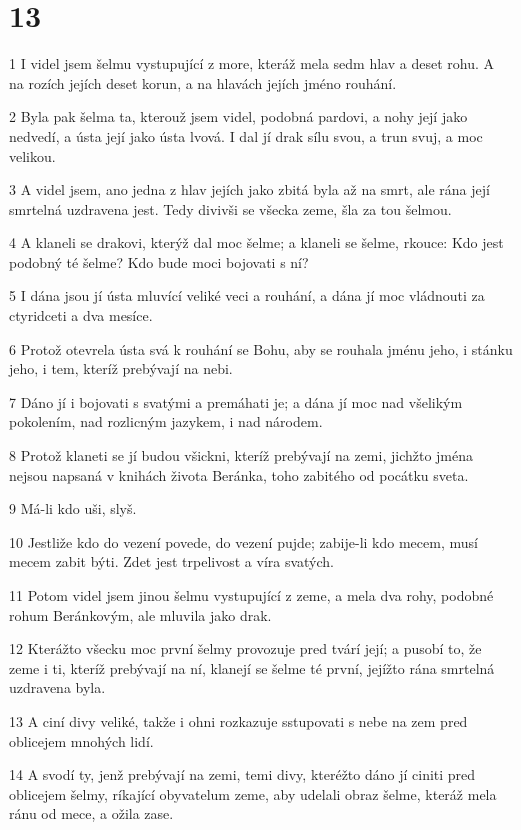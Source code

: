 \chapter{13}

\par 1 I videl jsem šelmu vystupující z more, kteráž mela sedm hlav a deset rohu. A na rozích jejích deset korun, a na hlavách jejích jméno rouhání.
\par 2 Byla pak šelma ta, kterouž jsem videl, podobná pardovi, a nohy její jako nedvedí, a ústa její jako ústa lvová. I dal jí drak sílu svou, a trun svuj, a moc velikou.
\par 3 A videl jsem, ano jedna z hlav jejích jako zbitá byla až na smrt, ale rána její smrtelná uzdravena jest. Tedy divivši se všecka zeme, šla za tou šelmou.
\par 4 A klaneli se drakovi, kterýž dal moc šelme; a klaneli se šelme, rkouce: Kdo jest podobný té šelme? Kdo bude moci bojovati s ní?
\par 5 I dána jsou jí ústa mluvící veliké veci a rouhání, a dána jí moc vládnouti za ctyridceti a dva mesíce.
\par 6 Protož otevrela ústa svá k rouhání se Bohu, aby se rouhala jménu jeho, i stánku jeho, i tem, kteríž prebývají na nebi.
\par 7 Dáno jí i bojovati s svatými a premáhati je; a dána jí moc nad všelikým pokolením, nad rozlicným jazykem, i nad národem.
\par 8 Protož klaneti se jí budou všickni, kteríž prebývají na zemi, jichžto jména nejsou napsaná v knihách života Beránka, toho zabitého od pocátku sveta.
\par 9 Má-li kdo uši, slyš.
\par 10 Jestliže kdo do vezení povede, do vezení pujde; zabije-li kdo mecem, musí mecem zabit býti. Zdet jest trpelivost a víra svatých.
\par 11 Potom videl jsem jinou šelmu vystupující z zeme, a mela dva rohy, podobné rohum Beránkovým, ale mluvila jako drak.
\par 12 Kterážto všecku moc první šelmy provozuje pred tvárí její; a pusobí to, že zeme i ti, kteríž prebývají na ní, klanejí se šelme té první, jejížto rána smrtelná uzdravena byla.
\par 13 A ciní divy veliké, takže i ohni rozkazuje sstupovati s nebe na zem pred oblicejem mnohých lidí.
\par 14 A svodí ty, jenž prebývají na zemi, temi divy, kteréžto dáno jí ciniti pred oblicejem šelmy, ríkající obyvatelum zeme, aby udelali obraz šelme, kteráž mela ránu od mece, a ožila zase.
